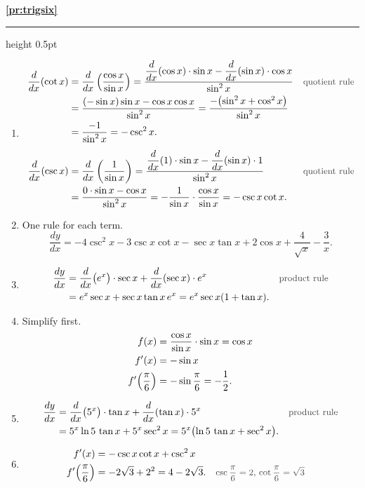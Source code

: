 \documentclass[11pt,a4paper]{article}
\newcommand{\solitem}[2]{%
 \par\addvspace{16pt}\Needspace{10\baselineskip}%
 {\large\bfseries \ref{#1}}\par\nobreak\vspace{2pt}%
 {\color{rulegray}\hrule height 0.5pt}\nobreak\vspace{7pt}%
 #2\par}
\newcommand{\why}[1]{\text{\small\color{darkgray}#1}}
\begin{document}
\solitem{pr:trigsix}{%
\begin{enumerate}[label=(\alph*)]
 \item
 \begin{align*}
 \dfrac{d}{dx}(\cot x)&=\dfrac{d}{dx}\left(\frac{\cos x}{\sin x}\right)=\frac{\dfrac{d}{dx}(\cos x)\cdot\sin x-\dfrac{d}{dx}(\sin x)\cdot\cos x}{\sin^2x} &&\why{quotient rule}\\
 &=\frac{(-\sin x)\sin x-\cos x\cos x}{\sin^2x}=\frac{-\bigl(\sin^2x+\cos^2x\bigr)}{\sin^2x}\\
 &=\frac{-1}{\sin^2x}=-\csc^2x.\\[4pt]
 \dfrac{d}{dx}(\csc x)&=\dfrac{d}{dx}\left(\frac{1}{\sin x}\right)=\frac{\dfrac{d}{dx}(1)\cdot\sin x-\dfrac{d}{dx}(\sin x)\cdot1}{\sin^2x} &&\why{quotient rule}\\
 &=\frac{0\cdot\sin x-\cos x}{\sin^2x}=-\frac{1}{\sin x}\cdot\frac{\cos x}{\sin x}=-\csc x\cot x.
 \end{align*}
 \item One rule for each term.
 \[
 \frac{dy}{dx}=-4\csc^2x-3\csc x\cot x-\sec x\tan x+2\cos x+\frac{4}{\sqrt x}-\frac3x.
 \]
 \item
 \begin{align*}
 \frac{dy}{dx}&=\frac{d}{dx}\bigl(e^x\bigr)\cdot\sec x+\frac{d}{dx}(\sec x)\cdot e^x &&\why{product rule}\\
 &=e^x\sec x+\sec x\tan x\,e^x=e^x\sec x(1+\tan x).
 \end{align*}
 \item Simplify first.
 \begin{align*}
 f(x)&=\frac{\cos x}{\sin x}\cdot\sin x=\cos x\\
 f'(x)&=-\sin x\\
 f'\Bigl(\frac{\pi}{6}\Bigr)&=-\sin\frac{\pi}{6}=-\frac12.
 \end{align*}
 \item
 \begin{align*}
 \frac{dy}{dx}&=\frac{d}{dx}\bigl(5^x\bigr)\cdot\tan x+\frac{d}{dx}(\tan x)\cdot5^x &&\why{product rule}\\
 &=5^x\ln5\,\tan x+5^x\sec^2x=5^x\bigl(\ln5\,\tan x+\sec^2x\bigr).
 \end{align*}
 \item
 \begin{align*}
 f'(x)&=-\csc x\cot x+\csc^2x\\
 f'\Bigl(\frac{\pi}{6}\Bigr)&=-2\sqrt3+2^2=4-2\sqrt3. &&\why{$\csc\dfrac{\pi}{6}=2$, $\cot\dfrac{\pi}{6}=\sqrt3$}
 \end{align*}
\end{enumerate}
}
\end{document}
